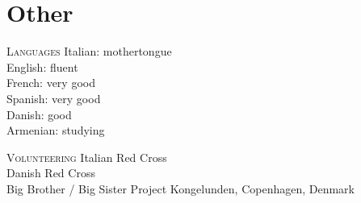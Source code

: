 \section*{Other}

\begin{paracol}{2}
  \textsc{Languages}
\switchcolumn
  Italian: mothertongue\\
  English: fluent\\
  French: very good\\
  Spanish: very good\\
  Danish: good\\
  Armenian: studying
\end{paracol}

\vspace{1em}

\begin{paracol}{2}
  \textsc{Volunteering}
\switchcolumn
  Italian Red Cross\\
  Danish Red Cross\\
  Big Brother / Big Sister Project Kongelunden, Copenhagen, Denmark
\end{paracol}
